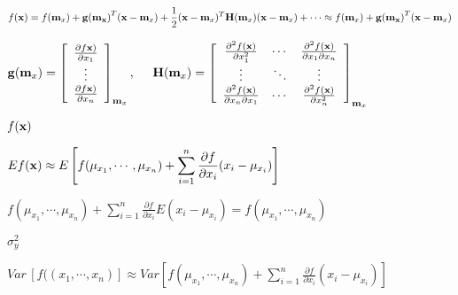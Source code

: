 \documentclass{article}
\def\lthtmlcheckvsize{\ifdim\ht\sizebox<\vsize 
  \ifdim\wd\sizebox<\hsize\expandafter\hfill\fi \expandafter\vfill
  \else\expandafter\vss\fi}%
\begin{document}
{\newpage\clearpage
{}%
$\displaystyle f({\bf x})=f({\bf m}_x)+{\bf g({\bf m}_x)}^T({\bf x}-{\bf m}_x)
+\frac{1}{2}({\bf x}-{\bf m}_x)^T{\bf H}({\bf m}_x)({\bf x}-{\bf m}_x)+\cdots
\approx f({\bf m}_x)+{\bf g({\bf m}_x)}^T({\bf x}-{\bf m}_x)$%
\lthtmlindisplaymathZ
\lthtmlcheckvsize\clearpage}

{\newpage\clearpage
{}%
$\displaystyle {\bf g}({\bf m}_x)
=\left[\begin{array}{c}\frac{\partial f{\bf x})}{\partial x_1}\\
\vdots\\\frac{\partial f{\bf x})}{\partial x_n}\end{array}\right]_{{\bf m}_x},
\;\;\;\;\;
{\bf H}({\bf m}_x)
=\left[ \begin{array}{ccc}
\frac{\partial^2 f({\bf x})}{\partial x_1^2} & \cdots &
\frac{\partial^2 f({\bf x})}{\partial x_1\partial x_n} \\
\vdots & \ddots & \vdots \\
\frac{\partial^2 f({\bf x})}{\partial x_n\partial x_1} & \cdots &
\frac{\partial^2 f({\bf x})}{\partial x_n^2}
\end{array} \right]_{{\bf m}_x}$%
\lthtmlindisplaymathZ
\lthtmlcheckvsize\clearpage}

{\newpage\clearpage
{}%
$ f({\bf x})$%
\lthtmlindisplaymathZ
\lthtmlcheckvsize\clearpage}

{\newpage\clearpage
{}%
$\displaystyle E f({\bf x})\approx E\left[
f(\mu_{x_1},\cdots,\mu_{x_n})+\sum_{i=1}^n \frac{\partial f}{\partial x_i} (x_i-\mu_{x_i})
\right]$%
\lthtmlindisplaymathZ
\lthtmlcheckvsize\clearpage}

{\newpage\clearpage
{}%
$\displaystyle f(\mu_{x_1},\cdots,\mu_{x_n})+\sum_{i=1}^n \frac{\partial f}{\partial x_i}E (x_i-\mu_{x_i})
=f(\mu_{x_1},\cdots,\mu_{x_n})$%
\lthtmlindisplaymathZ
\lthtmlcheckvsize\clearpage}

{\newpage\clearpage
{}%
$\displaystyle \sigma_y^2$%
\lthtmlindisplaymathZ
\lthtmlcheckvsize\clearpage}

{\newpage\clearpage
{}%
$\displaystyle Var\,[f((x_1,\cdots,x_n)]
\approx Var \left[
f(\mu_{x_1},\cdots,\mu_{x_n})+\sum_{i=1}^n \frac{\partial f}{\partial x_i} (x_i-\mu_{x_i})
\right]$%
\lthtmlindisplaymathZ
\lthtmlcheckvsize\clearpage}
\end{document}
